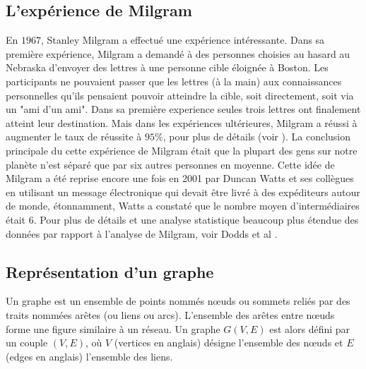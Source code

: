 \subsection{L’expérience de Milgram}
\label{Milgram} 
En $1967$, Stanley Milgram a effectué une expérience intéressante.  Dans sa première expérience, Milgram a demandé à des
personnes choisies au hasard au Nebraska d'envoyer des lettres à une personne cible éloignée à Boston.
Les participants ne pouvaient passer que les lettres (à la main) aux connaissances personnelles qu'ils pensaient pouvoir 
atteindre la cible, soit directement, soit via un  "ami d'un ami".  Dans sa première experience seules trois lettres ont
finalement atteint leur destination. Mais dans les expériences ultérieures, Milgram a réussi à augmenter
le taux de réussite à $95\%$, pour plus de détails (voir \cite{Mi1967,TM1969}). La conclusion principale du cette
expérience de Milgram était que la plupart des gens sur notre planète n'est séparé que par six autres personnes en moyenne.
Cette idée de Milgram a été reprise encore une fois en 2001 par Duncan Watts et ses collègues en utilisant un message 
électronique qui devait être livré à des expéditeurs autour de monde, étonnamment, Watts a constaté que le nombre moyen 
d'intermédiaires était $6$. Pour plus de détails et une analyse statistique beaucoup plus étendue des données par rapport
à l'analyse de Milgram, voir Dodds et al \cite{D-al2003}.

\subsection{Représentation d'un graphe}
Un graphe est un ensemble de points nommés nœuds ou sommets  reliés par des traits 
nommées arêtes (ou liens ou arcs). L'ensemble des arêtes entre nœuds forme une figure similaire à un 
réseau. Un  graphe $G(V,E)$ est alors défini par un couple $(V,E)$, où $V$ (vertices en anglais) désigne
l'ensemble des nœuds et $E$ (edges en anglais) l'ensemble des liens.

